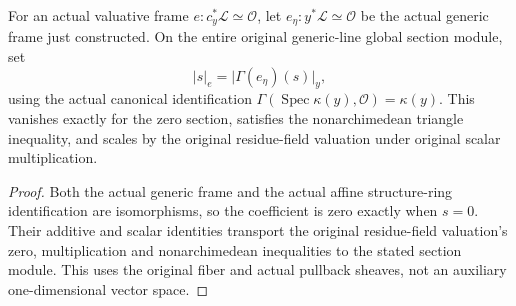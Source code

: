 \begin{definition}
\label{def:scheme-line-actual-center-frame-norm}
\leanok
{}
For an actual valuative frame $e:c_y^*\mathcal L\simeq\mathcal O$,
let $e_\eta:y^*\mathcal L\simeq\mathcal O$ be the actual generic
frame just constructed. On the entire original generic-line global
section module, set
\[
 \lvert s\rvert_e=\lvert\Gamma(e_\eta)(s)\rvert_y,
\]
using the actual canonical identification
$\Gamma(\operatorname{Spec}\kappa(y),\mathcal O)=\kappa(y)$.
This vanishes exactly for the zero section, satisfies the
nonarchimedean triangle inequality, and scales by the original
residue-field valuation under original scalar multiplication.
\end{definition}
\begin{proof}
Both the actual generic frame and the actual affine structure-ring
identification are isomorphisms, so the coefficient is zero exactly
when $s=0$. Their additive and scalar identities transport the
original residue-field valuation's zero, multiplication and
nonarchimedean inequalities to the stated section module. This uses
the original fiber and actual pullback sheaves, not an auxiliary
one-dimensional vector space.
\end{proof}
